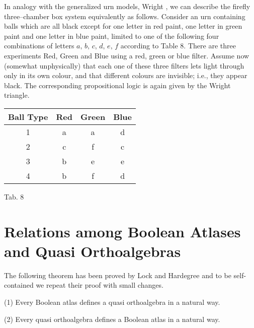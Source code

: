 In analogy with the generalized urn models, Wright \cite{Wri}, we can
describe the firefly three--chamber box system equivalently  as follows.
Consider an urn containing balls which are all black except for one
letter in red paint, one letter in green paint and one letter in blue
paint, limited to one of the following four combinations of letters
$a,\,b,\,c,\,d,\,e,\,f$ according to Table 8.
There are three experiments Red, Green
and Blue using  a red, green or blue filter. Assume now (somewhat
unphysically) that each one of
these three filters lets light through only in its own colour, and that
different colours  are invisible; i.e., they appear black.
The corresponding propositional logic is again
given by the Wright triangle.



\vspace{1cm}

\begin{center}
\begin{tabular}{|c|c|c|c|}\hline%
Ball Type & Red & Green& Blue \\ \hline
1   & a & a & d\\
2   & c & f & c\\
3   & b & e & e\\
4   & b & f & d\\
\hline
\end{tabular}

\begin{center} Tab. 8  \end{center}
\end{center}





\section{Relations among Boolean Atlases and Quasi Orthoalgebras}%

The following theorem has been proved by Lock and Hardegree and to be
self-contained we repeat their proof with small changes.

\begin{theorem}\label{th4.1} {\rm (1)} Every Boolean atlas defines a quasi orthoalgebra
in a natural way.

{\rm (2)} Every quasi orthoalgebra defines a Boolean atlas in a natural way.
\end{theorem}

